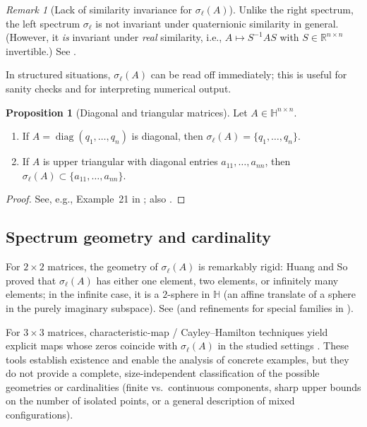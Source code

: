 \documentclass[preprint,12pt]{elsarticle}  %
\theoremstyle{definition}
\theoremstyle{definition}
\theoremstyle{definition}
\theoremstyle{definition}
\theoremstyle{definition}
\newtheorem{Pro}{Proposition}
\theoremstyle{remark}
\newtheorem{Rem}{Remark}
\theoremstyle{remark}
\theoremstyle{remark}
\newcommand{\RR}{\mathbb{R}}
\newcommand{\HH}{\mathbb{H}}
\DeclareMathOperator{\diag}{diag}
\begin{document}
\begin{Rem}[Lack of similarity invariance for $\sigma_\ell(A)$]
\label{rem_left_not_similarity_invariant}
Unlike the right spectrum, the left spectrum $\sigma_\ell$ is not invariant under quaternionic similarity in general.
(However, it \emph{is} invariant under \emph{real} similarity, i.e., $A\mapsto S^{-1}AS$ with $S\in\RR^{n\times n}$ invertible.)
See \cite{MaciasVirgosPereiraSaez2014,DeLeoScolariciSolombrino2002}.
\end{Rem}

In structured situations, $\sigma_\ell(A)$ can be read off immediately; this is useful for sanity checks and for
interpreting numerical output.

\begin{Pro}[Diagonal and triangular matrices]
\label{pro_diag_triangular_left}
Let $A\in\HH^{n\times n}$.
\begin{enumerate}
\item If $A=\diag(q_1,\dots,q_n)$ is diagonal, then $\sigma_\ell(A)=\{q_1,\dots,q_n\}$.
\item If $A$ is upper triangular with diagonal entries $a_{11},\dots,a_{nn}$, then $\sigma_\ell(A)\subset\{a_{11},\dots,a_{nn}\}$.
\end{enumerate}
\end{Pro}

\begin{proof}
See, e.g., Example~21 in \cite{MaciasVirgosPereiraSaez2014}; also \cite{Zhang1997,Rodman2014}.
\end{proof}

\subsection{Spectrum geometry and cardinality}
\label{subsec_left_2x2_and_beyond}
For $2\times2$ matrices, the geometry of $\sigma_\ell(A)$ is remarkably rigid: Huang and So proved that $\sigma_\ell(A)$ has either one element, two elements, or infinitely many elements; in the infinite case, it is a $2$-sphere in $\HH$ (an affine translate of a sphere in the purely imaginary subspace). See \cite{HuangSo2001} (and refinements for special families in \cite{MaciasVirgosPereiraSaez2009}).

For $3\times3$ matrices, characteristic-map / Cayley--Hamilton techniques yield explicit maps whose zeros coincide with $\sigma_\ell(A)$ in the studied settings \cite{MaciasVirgosPereiraSaez2014b,MaciasVirgosPereiraSaez2014}.
These tools establish existence and enable the analysis of concrete examples, but they do not provide a complete, size-independent classification of the possible geometries or cardinalities (finite vs.\ continuous components, sharp
upper bounds on the number of isolated points, or a general description of mixed configurations).
\end{document}
